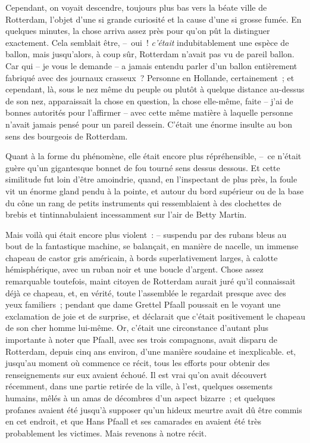 \documentclass[french,twoside]{book} %
\begin{document}
Cependant, on voyait descendre, toujours plus bas vers la béate ville de Rotterdam, l’objet d’une si grande curiosité et la cause d’une si grosse fumée. En quelques minutes, la chose arriva assez près pour qu’on pût la distinguer exactement. Cela semblait être, – oui ! \emph{c’était} indubitablement une espèce de ballon, mais jusqu’alors, à coup sûr, Rotterdam n’avait pas vu de pareil ballon. Car qui – je vous le demande – a jamais entendu parler d’un ballon entièrement fabriqué avec des journaux crasseux ? Personne en Hollande, certainement ; et cependant, là, sous le nez même du peuple ou plutôt à quelque distance au-dessus de son nez, apparaissait la chose en question, la chose elle-même, faite – j’ai de bonnes autorités pour l’affirmer – avec cette même matière à laquelle personne n’avait jamais pensé pour un pareil dessein. C’était une énorme insulte au bon sens des bourgeois de Rotterdam.\par
Quant à la forme du phénomène, elle était encore plus répréhensible, – ce n’était guère qu’un gigantesque bonnet de fou tourné sens dessus dessous. Et cette similitude fut loin d’être amoindrie, quand, en l’inspectant de plus près, la foule vit un énorme gland pendu à la pointe, et autour du bord supérieur ou de la base du cône un rang de petits instruments qui ressemblaient à des clochettes de brebis et tintinnabulaient incessamment sur l’air de Betty Martin.\par
Mais voilà qui était encore plus violent : – suspendu par des rubans bleus au bout de la fantastique machine, se balançait, en manière de nacelle, un immense chapeau de castor gris américain, à bords superlativement larges, à calotte hémisphérique, avec un ruban noir et une boucle d’argent. Chose assez remarquable toutefois, maint citoyen de Rotterdam aurait juré qu’il connaissait déjà ce chapeau, et, en vérité, toute l’assemblée le regardait presque avec des yeux familiers ; pendant que dame Grettel Pfaall poussait en le voyant une exclamation de joie et de surprise, et déclarait que c’était positivement le chapeau de son cher homme lui-même. Or, c’était une circonstance d’autant plus importante à noter que Pfaall, avec ses trois compagnons, avait disparu de Rotterdam, depuis cinq ans environ, d’une manière soudaine et inexplicable. et, jusqu’au moment où commence ce récit, tous les efforts pour obtenir des renseignements sur eux avaient échoué. Il est vrai qu’on avait découvert récemment, dans une partie retirée de la ville, à l’est, quelques ossements humains, mêlés à un amas de décombres d’un aspect bizarre ; et quelques profanes avaient été jusqu’à supposer qu’un hideux meurtre avait dû être commis en cet endroit, et que Hans Pfaall et ses camarades en avaient été très probablement les victimes. Mais revenons à notre récit.\par
\end{document}
